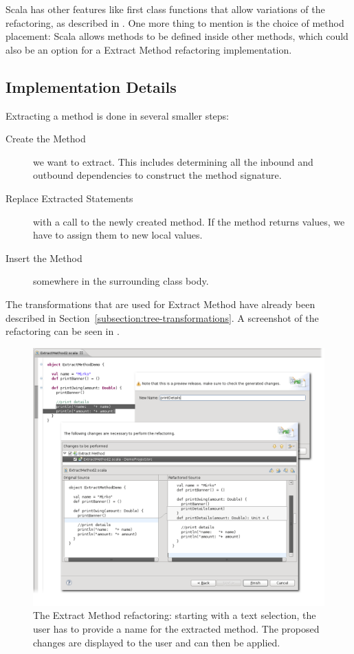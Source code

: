 \documentclass[10pt,a4paper,oneside]{scrreprt}
\begin{document}
Scala has other features like first class functions that allow variations of the refactoring, as described in \cite{ScalaRefactoring}. One more thing to mention is the choice of method placement: Scala allows methods to be defined inside other methods, which could also be an option for a Extract Method refactoring implementation.

\subsection{Implementation Details}

Extracting a method is done in several smaller steps:

\begin{description}
  \item[Create the Method] we want to extract. This includes determining all the inbound and outbound dependencies to construct the method signature.
  \item[Replace Extracted Statements] with a call to the newly created method. If the method returns values, we have to assign them to new local values.
  \item[Insert the Method] somewhere in the surrounding class body.
\end{description}

The transformations that are used for Extract Method have already been described in Section~\vref{subsection:tree-transformations}. 
A screenshot of the refactoring can be seen in .

\begin{figure}
  \centering
  \includegraphics[width=\linewidth]{extract_method_screenshot_1.png}
  \caption{The Extract Method refactoring: starting with a text selection, the user has to provide a name for the extracted method. The proposed changes are displayed to the user and can then be applied.}
  \label{figure:extract-method-screenshot-1}
\end{figure}
\end{document}
